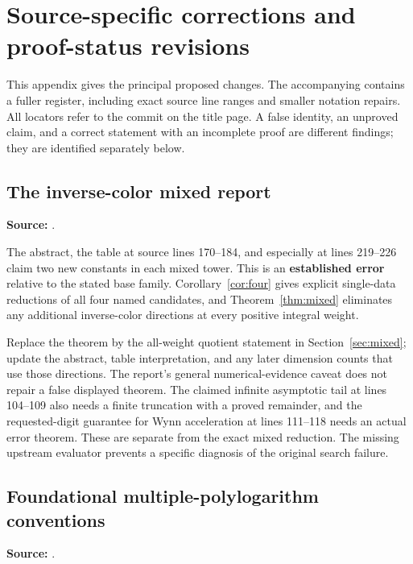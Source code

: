 \appendix
\section{Source-specific corrections and proof-status revisions}
\label{app:audit}

This appendix gives the principal proposed changes. The accompanying
 contains a fuller register, including exact
source line ranges and smaller notation repairs. All locators refer
to the commit on the title page. A false identity, an unproved claim,
and a correct statement with an incomplete proof are different
findings; they are identified separately below.

\subsection{The inverse-color mixed report}

\noindent\textbf{Source:}
.

The abstract, the table at source lines 170--184, and especially
 at lines 219--226 claim two new constants in
each mixed tower. This is an \textbf{established error} relative to
the stated base family. Corollary~\ref{cor:four} gives explicit
single-data reductions of all four named candidates, and
Theorem~\ref{thm:mixed} eliminates any additional inverse-color
directions at every positive integral weight.

Replace the theorem by the all-weight quotient statement in
Section~\ref{sec:mixed}; update the abstract, table interpretation,
and any later dimension counts that use those directions.
The report's general numerical-evidence caveat does not repair a
false displayed theorem.
The claimed infinite asymptotic tail at lines 104--109 also needs a
finite truncation with a proved remainder, and the requested-digit
guarantee for Wynn acceleration at lines 111--118 needs an actual
error theorem. These are separate from the exact mixed reduction.
The missing upstream evaluator prevents a specific diagnosis of the
original search failure.

\subsection{Foundational multiple-polylogarithm conventions}

\noindent\textbf{Source:}
.

